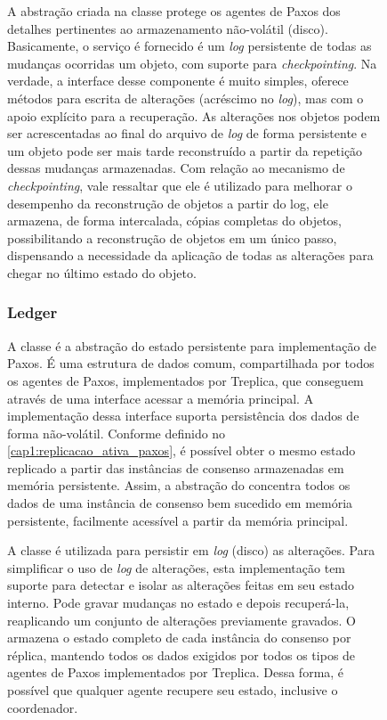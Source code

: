 \begin{figure}[ht]
A abstração criada na classe  protege os agentes de Paxos dos
detalhes pertinentes ao armazenamento não-volátil (disco). Basicamente, o serviço é
fornecido é um \emph{log} persistente de todas as mudanças ocorridas um objeto, com
suporte para \emph{checkpointing}. Na verdade, a interface desse componente é muito
simples, oferece métodos para escrita de alterações (acréscimo no \emph{log}), mas com o
apoio explícito para a recuperação. As alterações nos objetos podem ser acrescentadas ao
final do arquivo de \emph{log} de forma persistente e um objeto pode ser mais tarde
reconstruído a partir da repetição dessas mudanças armazenadas. Com relação ao mecanismo
de \emph{checkpointing}, vale ressaltar que ele é utilizado para melhorar o desempenho da
reconstrução de objetos a partir do log, ele armazena, de forma intercalada, cópias
completas do objetos, possibilitando a reconstrução de objetos em um único passo,
dispensando a necessidade da aplicação de todas as alterações para chegar no último estado
do objeto.

\subsubsection{Ledger}

A classe  é a abstração do estado persistente para implementação de
Paxos. É uma estrutura de dados comum, compartilhada por todos os agentes de Paxos,
implementados por Treplica, que conseguem através de uma interface acessar a memória
principal. A implementação dessa interface suporta persistência dos dados de forma
não-volátil. Conforme definido no \autoref{cap1:replicacao_ativa_paxos}, é possível obter
o mesmo estado replicado a partir das instâncias de consenso armazenadas em memória
persistente. Assim, a abstração do  concentra todos os dados de uma
instância de consenso bem sucedido em memória persistente, facilmente acessível a partir
da memória principal.

A classe  é utilizada para persistir em \emph{log} (disco) as
alterações. Para simplificar o uso de \emph{log} de alterações, esta implementação tem
suporte para detectar e isolar as alterações feitas em seu estado interno. Pode gravar
mudanças no estado e depois recuperá-la, reaplicando um conjunto de alterações previamente
gravados. O  armazena o estado completo de cada instância do consenso
por réplica, mantendo todos os dados exigidos por todos os tipos de agentes de Paxos
implementados por Treplica. Dessa forma, é possível que qualquer agente recupere seu
estado, inclusive o coordenador.


\end{figure}
